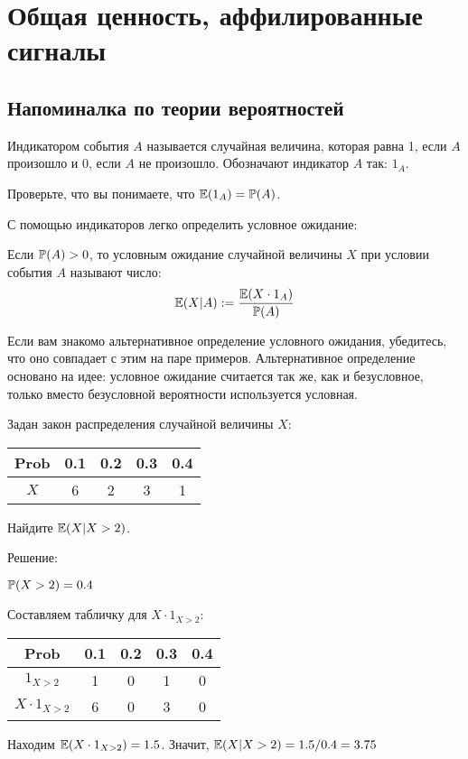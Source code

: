 \chapter{Общая ценность, аффилированные сигналы}


\section{Напоминалка по теории вероятностей}



\begin{mydef}
Индикатором события $ A $ называется случайная величина, которая равна 1, если $ A $ произошло и 0, если $ A $ не произошло. Обозначают индикатор $ A $ так: $ 1_{A} $.
\end{mydef}

Проверьте, что вы понимаете, что $ \E(1_{A})=\P(A) $.

С помощью индикаторов легко определить условное ожидание:

\begin{mydef}
Если $ \P(A)>0 $, то условным ожидание случайной величины $ X $ при условии события $ A $ называют число:
\[ \E(X|A):=\frac{\E(X\cdot 1_{A})}{\P(A)} \]
\label{posit_condition}
\end{mydef}

Если вам знакомо альтернативное определение условного ожидания, убедитесь, что оно совпадает с этим на паре примеров. Альтернативное определение основано на идее: условное ожидание считается так же, как и безусловное, только вместо безусловной вероятности используется условная.

\begin{myex} Задан закон распределения случайной величины $X$:


\begin{tabular}{c|cccc}
Prob & 0.1 & 0.2 & 0.3 & 0.4 \\
\hline
$X$ & 6 & 2 & 3 & 1 \\
\end{tabular}

Найдите $ \E(X|X>2) $.

Решение:

$\P(X>2)=0.4$

Составляем табличку для $ X\cdot 1_{X>2} $:

\begin{tabular}{c|cccc}
Prob & 0.1 & 0.2 & 0.3 & 0.4 \\
\hline
$1_{X>2}$ & 1 & 0 & 1 & 0 \\
$X\cdot 1_{X>2}$ & 6 & 0 & 3 & 0 \\
\end{tabular}

Находим $ \E(X\cdot 1_{X>2})=1.5 $. Значит, $ \E(X|X>2)=1.5/0.4=3.75 $

\end{myex}


